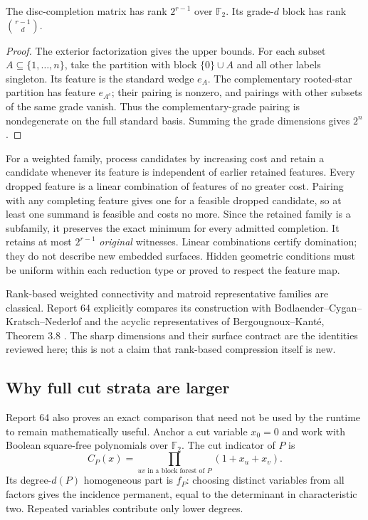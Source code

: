 \begin{proposition}
The disc-completion matrix has rank $2^{r-1}$ over $\mathbb F_2$.
Its grade-$d$ block has rank $\binom{r-1}{d}$.
\end{proposition}
\begin{proof}
The exterior factorization gives the upper bounds. For each subset
$A\subseteq\{1,\ldots,n\}$, take the partition with block $\{0\}\cup A$
and all other labels singleton. Its feature is the standard wedge $e_A$.
The complementary rooted-star partition has feature $e_{A^c}$; their
pairing is nonzero, and pairings with other subsets of the same grade vanish.
Thus the complementary-grade pairing is nondegenerate on the full standard
basis. Summing the grade dimensions gives $2^n$.
\end{proof}

For a weighted family, process candidates by increasing cost and retain a
candidate whenever its feature is independent of earlier retained features.
Every dropped feature is a linear combination of features of no greater
cost. Pairing with any completing feature gives one for a feasible dropped
candidate, so at least one summand is feasible and costs no more. Since the
retained family is a subfamily, it preserves the exact minimum for every
admitted completion. It retains at most $2^{r-1}$ \emph{original} witnesses.
Linear combinations certify domination; they do not describe new embedded
surfaces. Hidden geometric conditions must be uniform within each reduction
type or proved to respect the feature map.

Rank-based weighted connectivity and matroid representative families are
classical. Report 64 explicitly compares its construction with
Bodlaender--Cygan--Kratsch--Nederlof and the acyclic representatives of
Bergougnoux--Kant\'e, Theorem 3.8
\cite{completion-rank-classical,completion-acyclic-classical}.
The sharp dimensions and their surface contract are the identities reviewed
here; this is not a claim that rank-based compression itself is new.

\subsection{Why full cut strata are larger}

Report 64 also proves an exact comparison that need not be used by the
runtime to remain mathematically useful. Anchor a cut variable $x_0=0$ and
work with Boolean square-free polynomials over $\mathbb F_2$. The cut indicator
of $P$ is
\[
 C_P(x)=\prod_{uv\text{ in a block forest of }P}(1+x_u+x_v).
\]
Its degree-$d(P)$ homogeneous part is $f_P$: choosing distinct variables
from all factors gives the incidence permanent, equal to the determinant
in characteristic two. Repeated variables contribute only lower degrees.

